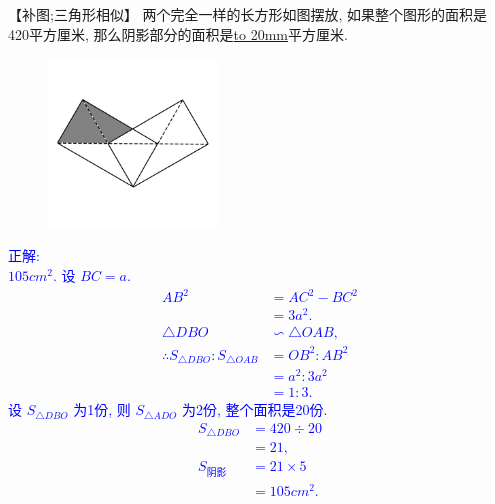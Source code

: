 \item {
    【补图;三角形相似】
    两个完全一样的长方形如图摆放, 如果整个图形的面积是 420平方厘米, 那么阴影部分的面积是\underline{\hbox to 20mm{}}平方厘米.
    \begin{figure}[H]
        \centering
        \includegraphics[width=0.4\textwidth]{./pics/Chapter_2/5.png}
    \end{figure}
    \ifshowSolution 
        \fangsong{}\textcolor{blue}{
            正解: \\
            $105 {cm}^2$. 设 $BC=a$. \\
            \begin{align*}
                {AB}^2 &= {AC}^2 - {BC}^2 \\
                       &= 3{a}^2. \\
                \triangle DBO &\backsim \triangle OAB,\\
                \therefore S_{\triangle DBO} : S_{\triangle OAB} &= {OB}^2 : {AB}^2 \\
                &= {a}^2 : 3{a}^2 \\
                &=  1:3.
            \end{align*}
            设 $S_{\triangle DBO}$ 为1份, 则 $S_{\triangle ADO}$ 为2份, 整个面积是20份.\\
            \begin{align*}
                S_{\triangle DBO} &= 420\div 20 \\
                       &= 21, \\
                S_{阴影} &= 21\times 5 \\
                &= 105 {cm}^2.
            \end{align*}
        }
    \else
        \vspace{1cm}
    \fi
}

